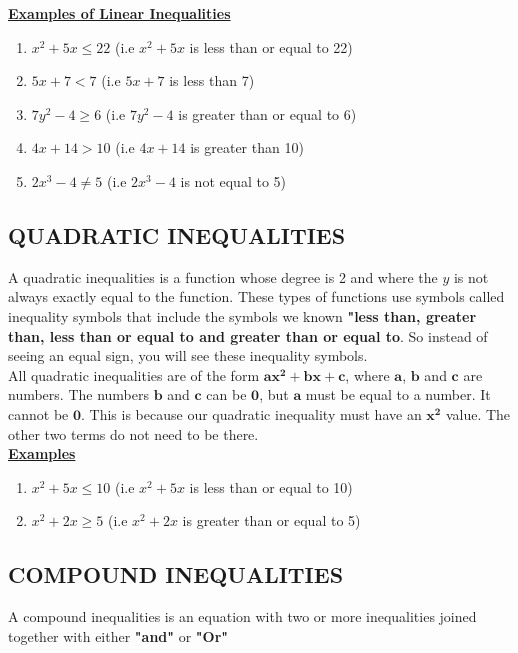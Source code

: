 \documentclass[12pt]{report}
\newcommand{\bt}[1]{\textbf{#1}}
\newcommand{\ubt}[1]{\textbf{\underline{#1}}}
\newcommand{\NI}{\noindent}
\begin{document}
	\NI \ubt{Examples of Linear Inequalities}
	\begin{enumerate}
		\item $x^2 + 5x \leq 22$ (i.e $x^2 + 5x$ is less than or equal to 22)
			
		\item $5x + 7 < 7$ (i.e $5x + 7$ is less than 7)
			
		\item $7y^2 - 4 \geq 6$ (i.e $7y^2 - 4$ is greater than or equal to 6)
			
		\item $4x + 14 > 10$ (i.e $4x + 14$ is greater than 10)
			
		\item $2x^3 - 4 \neq 5$ (i.e $2x^3 - 4$ is not equal to 5)
	\end{enumerate}
	
	\subsection{QUADRATIC INEQUALITIES}
	A quadratic inequalities is a function whose degree is 2 and where the $y$ is not always exactly equal to the function. These types of functions use symbols called inequality symbols that include the symbols we known \bt{"less than, greater than, less than or equal to and greater than or equal to}. So instead of seeing an equal sign, you will see these inequality symbols.\\
		
	\NI All quadratic inequalities are of the form $\mathbf{ax^2 + bx + c}$, where $\mathbf{a}$, $\mathbf{b}$ and $\mathbf{c}$ are numbers. The numbers $\mathbf{b}$ and $\mathbf{c}$ can be $\mathbf{0}$, but $\mathbf{a}$ must be equal to a number. It cannot be $\mathbf{0}$. This is because our quadratic inequality must have an $\mathbf{x^2}$ value. The other two terms do not need to be there.\\
		
	\NI\ubt{Examples}
	\begin{enumerate}
		\item $x^2 + 5x \leq 10$ (i.e $x^2 + 5x$ is less than or equal to 10)
			
		\item $x^2 + 2x \geq 5$ (i.e $x^2 + 2x$ is greater than or equal to 5)
	\end{enumerate}
	
	\subsection{COMPOUND INEQUALITIES}
	A compound inequalities is an equation with two or more inequalities joined together with either \bt{"and"} or \bt{"Or"}\\
		
\end{document}

